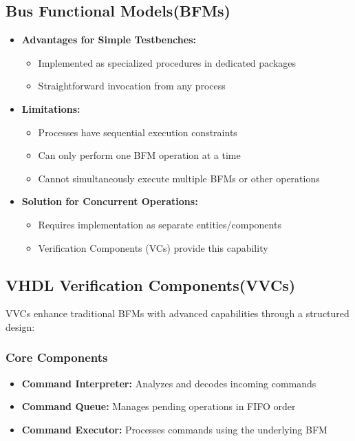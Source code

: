 \documentclass{article}
\begin{document}
\subsection{Bus Functional Models(BFMs)}
\begin{itemize}
    \item \textbf{Advantages for Simple Testbenches:}
    \begin{itemize}
        \item Implemented as specialized procedures in dedicated packages
        \item Straightforward invocation from any process
    \end{itemize}
    
    \item \textbf{Limitations:}
    \begin{itemize}
        \item Processes have sequential execution constraints
        \item Can only perform one BFM operation at a time
        \item Cannot simultaneously execute multiple BFMs or other operations
    \end{itemize}
    
    \item \textbf{Solution for Concurrent Operations:}
    \begin{itemize}
        \item Requires implementation as separate entities/components
        \item Verification Components (VCs) provide this capability
    \end{itemize}
\end{itemize}

\subsection{VHDL Verification Components(VVCs)}
VVCs enhance traditional BFMs with advanced capabilities through a structured design:

\subsubsection*{Core Components}
\begin{itemize}
    \item \textbf{Command Interpreter:} Analyzes and decodes incoming commands
    \item \textbf{Command Queue:} Manages pending operations in FIFO order  
    \item \textbf{Command Executor:} Processes commands using the underlying BFM
\end{itemize}
\end{document}
